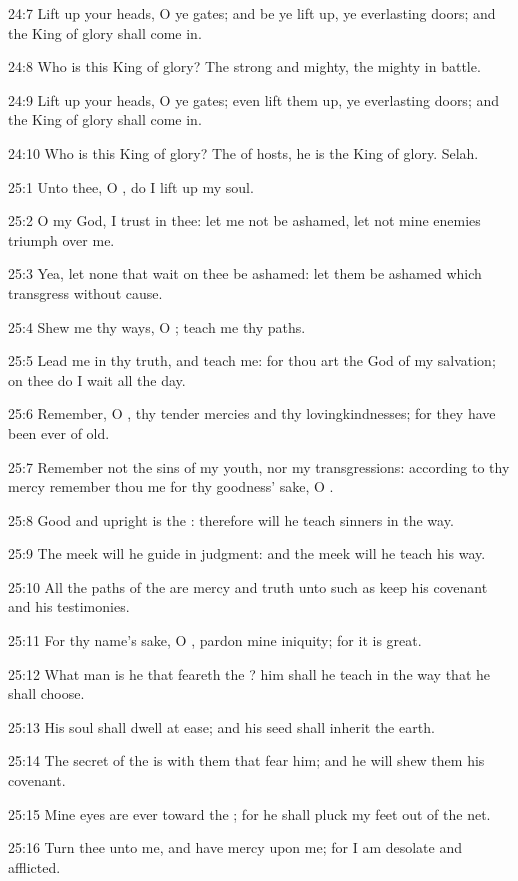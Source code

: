 24:7 Lift up your heads, O ye gates; and be ye lift up, ye everlasting doors; and the King of glory shall come in.

24:8 Who is this King of glory? The \LORD strong and mighty, the \LORD mighty in battle.

24:9 Lift up your heads, O ye gates; even lift them up, ye everlasting doors; and the King of glory shall come in.

24:10 Who is this King of glory? The \LORD of hosts, he is the King of glory. Selah.



25:1 Unto thee, O \LORD, do I lift up my soul.

25:2 O my God, I trust in thee: let me not be ashamed, let not mine enemies triumph over me.

25:3 Yea, let none that wait on thee be ashamed: let them be ashamed which transgress without cause.

25:4 Shew me thy ways, O \LORD; teach me thy paths.

25:5 Lead me in thy truth, and teach me: for thou art the God of my salvation; on thee do I wait all the day.

25:6 Remember, O \LORD, thy tender mercies and thy lovingkindnesses; for they have been ever of old.

25:7 Remember not the sins of my youth, nor my transgressions: according to thy mercy remember thou me for thy goodness' sake, O \LORD.

25:8 Good and upright is the \LORD: therefore will he teach sinners in the way.

25:9 The meek will he guide in judgment: and the meek will he teach his way.

25:10 All the paths of the \LORD are mercy and truth unto such as keep his covenant and his testimonies.

25:11 For thy name's sake, O \LORD, pardon mine iniquity; for it is great.

25:12 What man is he that feareth the \LORD? him shall he teach in the way that he shall choose.

25:13 His soul shall dwell at ease; and his seed shall inherit the earth.

25:14 The secret of the \LORD is with them that fear him; and he will shew them his covenant.

25:15 Mine eyes are ever toward the \LORD; for he shall pluck my feet out of the net.

25:16 Turn thee unto me, and have mercy upon me; for I am desolate and afflicted.

